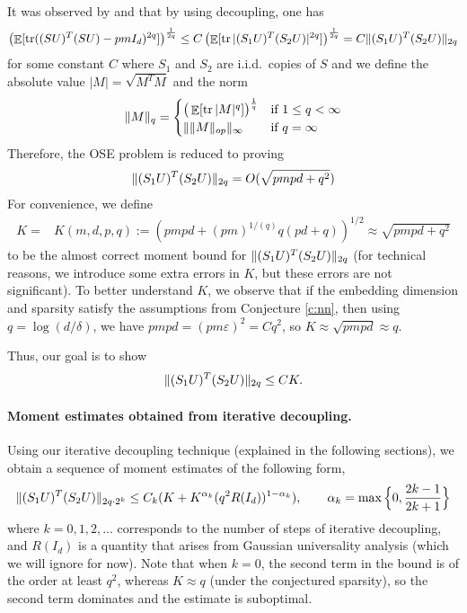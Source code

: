 \documentclass[11pt]{amsart}
\numberwithin{equation}{section}
\numberwithin{equation}{section}
\DeclareMathOperator{\E}{\mathbb{E}}
\DeclareMathOperator*{\tr}{tr}
\DeclarePairedDelimiter{\norm}{\lVert}{\rVert}
\begin{document}
It was observed by \cite{cohen2016nearly} and \cite{chenakkod2025optimal} that by using decoupling, one has
\begin{align*}
    \left( \E[\tr((S U)^T(S U)-pmI_{d })^{2q}] \right)^{\frac{1}{2q}}  \le C\left( \E[\tr|(S_1 U)^T(S_2 U)|^{2q}] \right)^{\frac{1}{2q}}=C\norm{(S_1 U)^T(S_2 U)}_{2q}
\end{align*}
for some constant $C$ where $S_1$ and $S_2$ are i.i.d.\ copies of $S$ and we define the absolute value $|M|=\sqrt{M^TM}$ and the norm
\begin{align*}
	\norm{M}_q = \begin{cases}
	\big(\E[\tr |M|^q]\big)^{\frac{1}{q}} & \text{if }1\le q<\infty\\
	\| \norm{M}_{op} \|_\infty & \text{if }q=\infty
	\end{cases}
\end{align*}
Therefore, the OSE problem is reduced to proving
\begin{equation}\label{eq:optmom}
    \begin{aligned}
    \norm{(S_1 U)^T(S_2 U)}_{2q} = O(\sqrt{pmpd+q^2})
\end{aligned}
\end{equation}
For convenience, we define
\begin{align*}
    K=&K(m,d,p,q):=\left(pmpd+(pm)^{1/(q)}q(pd+q) \right)^{1/2}  \approx \sqrt{pmpd+q^2}
\end{align*}
to be the almost correct moment bound for $\norm{(S_1 U)^T(S_2 U)}_{2q}$ (for technical reasons, we introduce some extra errors in $K$, but these errors are not significant). To better understand $K$, we observe that if the embedding dimension and sparsity satisfy the assumptions from Conjecture \ref{c:nn}, then using $q=\log(d/\delta)$, we have $pmpd=(pm\varepsilon)^2=Cq^2$, so $K \approx \sqrt{pmpd} \approx q$.

Thus, our goal is to show
\begin{equation}\label{eq:optmomK}
    \begin{aligned}
    \norm{(S_1 U)^T(S_2 U)}_{2q} \le C K .
\end{aligned}
\end{equation}

\paragraph{\textbf{Moment estimates obtained from iterative decoupling.}}
Using our iterative decoupling technique (explained in the following sections), we obtain a sequence of moment estimates of the following form, 
\begin{align} \norm{(S_1 U)^T(S_2 U)}_{2q \cdot 2^k} \le C_k(K+K^{\alpha_k}(q^{2}R(I_d))^{1-\alpha_k}),\qquad\alpha_k =\max\Big\{0,\frac{2k-1}{2k+1}\Big\}\label{eq:high-level-moment-estimates}
\end{align}
where $k=0,1,2,...$ corresponds to the number of steps of iterative decoupling, and $R(I_d)$ is a quantity that arises from Gaussian universality analysis (which we will ignore for now). Note that when $k=0$, the second term in the bound is of the order at least $q^{2}$, whereas $K \approx q$ (under  the conjectured sparsity), so the second term dominates and the estimate is suboptimal.
\end{document}
